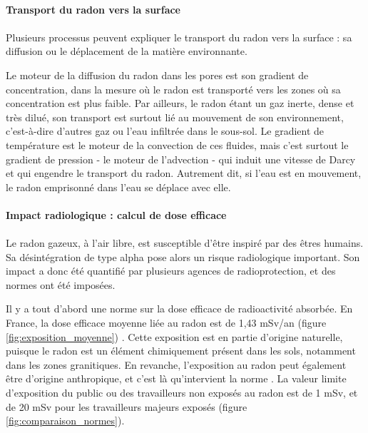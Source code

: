 \documentclass{article}
\begin{document}
\paragraph{Transport du radon vers la surface}

\paragraph{} Plusieurs processus peuvent expliquer le transport du radon vers la surface \cite{irsn_ineris_radon_nodate} : sa diffusion ou le déplacement de la matière environnante.

Le moteur de la diffusion du radon dans les pores est son gradient de concentration, dans la mesure où le radon est transporté vers les zones où sa concentration est plus faible. Par ailleurs, le radon étant un gaz inerte, dense et très dilué, son transport est surtout lié au mouvement de son environnement, c’est-à-dire d’autres gaz ou l’eau infiltrée dans le sous-sol. Le gradient de température est le moteur de la convection de ces fluides, mais c’est surtout le gradient de pression - le moteur de l’advection - qui induit une vitesse de Darcy et qui engendre le transport du radon. Autrement dit, si l’eau est en mouvement, le radon emprisonné dans l’eau se déplace avec elle.

\paragraph{Impact radiologique : calcul de dose efficace}

\paragraph{} Le radon gazeux, à l’air libre, est susceptible d’être inspiré par des êtres humains. Sa désintégration de type alpha pose alors un risque radiologique important. Son impact a donc été quantifié par plusieurs agences de radioprotection, et des normes ont été imposées.

Il y a tout d’abord une norme sur la dose efficace de radioactivité absorbée. En France, la dose efficace moyenne liée au radon est de 1,43 mSv/an (figure \ref{fig:exposition_moyenne}) \cite{irsn_quelle_nodate}. Cette exposition est en partie d’origine naturelle, puisque le radon est un élément chimiquement présent dans les sols, notamment dans les zones granitiques. En revanche, l’exposition au radon peut également être d’origine anthropique, et c’est là qu’intervient la norme \cite{inrs_rayonnements_nodate}. La valeur limite d’exposition du public ou des travailleurs non exposés au radon est de 1 mSv, et de 20 mSv pour les travailleurs majeurs exposés (figure \ref{fig:comparaison_normes}).
\end{document}
